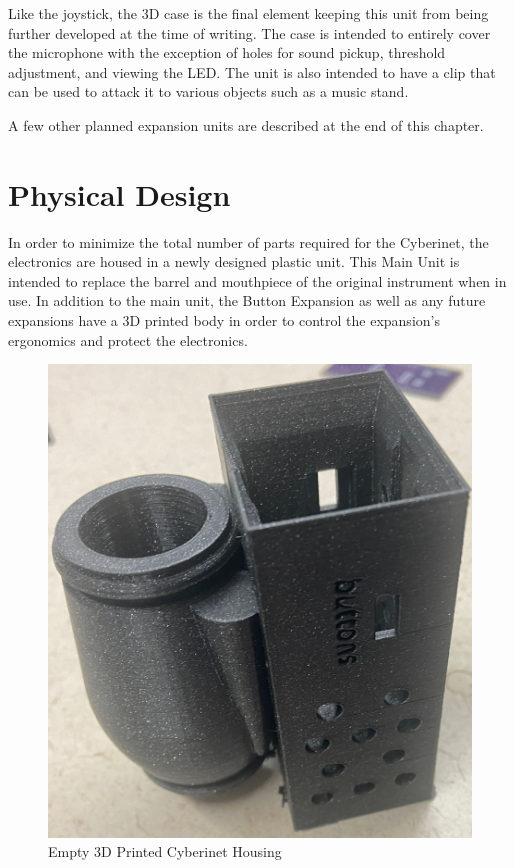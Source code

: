 Like the joystick, the 3D case is the final element keeping this unit from being further developed at the time of writing. The case is intended to entirely cover the microphone with the exception of holes for sound pickup, threshold adjustment, and viewing the LED. The unit is also intended to have a clip that can be used to attack it to various objects such as a music stand.

A few other planned expansion units are described at the end of this chapter.

\section{Physical Design}
In order to minimize the total number of parts required for the Cyberinet, the electronics are housed in a newly designed plastic unit. This Main Unit is intended to replace the barrel and mouthpiece of the original instrument when in use. In addition to the main unit, the Button Expansion as well as any future expansions have a 3D printed body in order to control the expansion's ergonomics and protect the electronics.

\begin{center}
    \begin{figure}
        \centering
        \includegraphics[scale=0.1]{diagrams/builtUnits/emptyCase.JPG}
        \caption{Empty 3D Printed Cyberinet Housing}
        \label{fig:cybernetCase}
    \end{figure}
\end{center}

